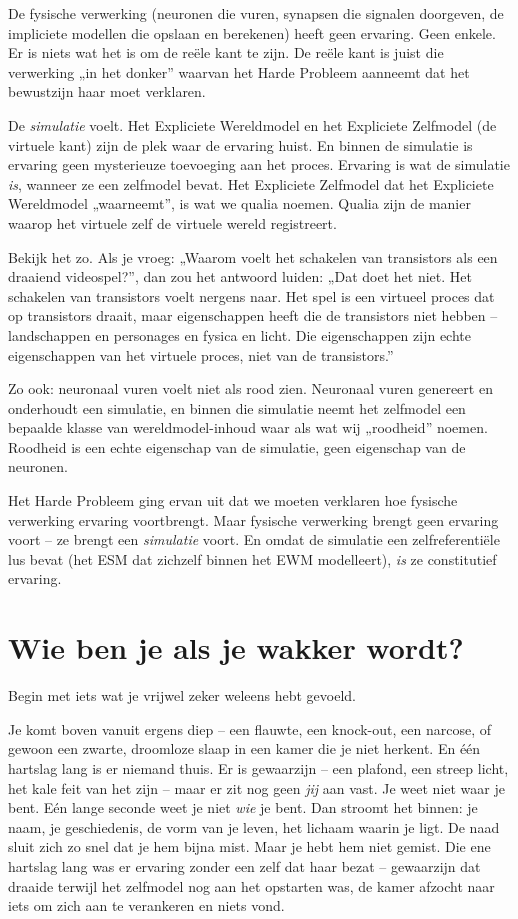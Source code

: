 \documentclass[11pt, twoside, openright]{book}
\begin{document}
De fysische verwerking (neuronen die vuren, synapsen die signalen doorgeven, de impliciete modellen die opslaan en berekenen) heeft geen ervaring. Geen enkele. Er is niets wat het is om de reële kant te zijn. De reële kant is juist die verwerking „in het donker” waarvan het Harde Probleem aanneemt dat het bewustzijn haar moet verklaren.

De \textit{simulatie} voelt. Het Expliciete Wereldmodel en het Expliciete Zelfmodel (de virtuele kant) zijn de plek waar de ervaring huist. En binnen de simulatie is ervaring geen mysterieuze toevoeging aan het proces. Ervaring is wat de simulatie \textit{is}, wanneer ze een zelfmodel bevat. Het Expliciete Zelfmodel dat het Expliciete Wereldmodel „waarneemt”, is wat we qualia noemen. Qualia zijn de manier waarop het virtuele zelf de virtuele wereld registreert.

Bekijk het zo. Als je vroeg: „Waarom voelt het schakelen van transistors als een draaiend videospel?”, dan zou het antwoord luiden: „Dat doet het niet. Het schakelen van transistors voelt nergens naar. Het spel is een virtueel proces dat op transistors draait, maar eigenschappen heeft die de transistors niet hebben -- landschappen en personages en fysica en licht. Die eigenschappen zijn echte eigenschappen van het virtuele proces, niet van de transistors.”

Zo ook: neuronaal vuren voelt niet als rood zien. Neuronaal vuren genereert en onderhoudt een simulatie, en binnen die simulatie neemt het zelfmodel een bepaalde klasse van wereldmodel-inhoud waar als wat wij „roodheid” noemen. Roodheid is een echte eigenschap van de simulatie, geen eigenschap van de neuronen.

Het Harde Probleem ging ervan uit dat we moeten verklaren hoe fysische verwerking ervaring voortbrengt. Maar fysische verwerking brengt geen ervaring voort -- ze brengt een \textit{simulatie} voort. En omdat de simulatie een zelfreferentiële lus bevat (het ESM dat zichzelf binnen het EWM modelleert), \textit{is} ze constitutief ervaring.

\section*{Wie ben je als je wakker wordt?}

Begin met iets wat je vrijwel zeker weleens hebt gevoeld.

Je komt boven vanuit ergens diep -- een flauwte, een knock-out, een narcose, of gewoon een zwarte, droomloze slaap in een kamer die je niet herkent. En één hartslag lang is er niemand thuis. Er is gewaarzijn -- een plafond, een streep licht, het kale feit van het zijn -- maar er zit nog geen \textit{jij} aan vast. Je weet niet waar je bent. Eén lange seconde weet je niet \textit{wie} je bent. Dan stroomt het binnen: je naam, je geschiedenis, de vorm van je leven, het lichaam waarin je ligt. De naad sluit zich zo snel dat je hem bijna mist. Maar je hebt hem niet gemist. Die ene hartslag lang was er ervaring zonder een zelf dat haar bezat -- gewaarzijn dat draaide terwijl het zelfmodel nog aan het opstarten was, de kamer afzocht naar iets om zich aan te verankeren en niets vond.
\end{document}

